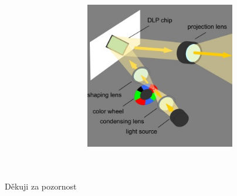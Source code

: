 \documentclass[aspectratio=169,11pt, allowframebreak=0.9]{beamer}
\begin{document}
\begin{frame}
\begin{columns}
\begin{figure}
                \end{figure}
                \begin{figure}
                    \centering
                    \includegraphics[width=0.8\textwidth]{dlp}
                
                \end{figure}
                \end{columns}
                \end{frame}
\section*{}
\begin{frame}[standout]
    \Huge
    Děkuji za pozornost
    \end{frame}
\end{document}
